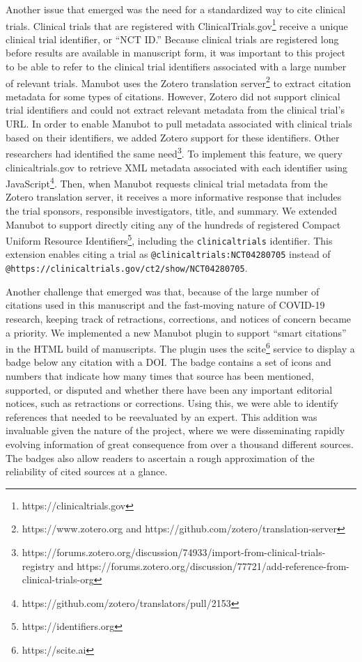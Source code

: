 \documentclass[twocolumn]{ceurart}
\begin{document}
Another issue that emerged was the need for a standardized way to cite clinical trials.
Clinical trials that are registered with ClinicalTrials.gov\footnote{https://clinicaltrials.gov} receive a unique clinical trial identifier, or ``NCT ID.''
Because clinical trials are registered long before results are available in manuscript form, it was important to this project to be able to refer to the clinical trial identifiers associated with a large number of relevant trials.
Manubot uses the Zotero translation server\footnote{https://www.zotero.org and https://github.com/zotero/translation-server} to extract citation metadata for some types of citations.
However, Zotero did not support clinical trial identifiers and could not extract relevant metadata from the clinical trial's URL.
In order to enable Manubot to pull metadata associated with clinical trials based on their identifiers, we added Zotero support for these identifiers.
Other researchers had identified the same need\footnote{https://forums.zotero.org/discussion/74933/import-from-clinical-trials-registry and https://forums.zotero.org/discussion/77721/add-reference-from-clinical-trials-org}.
To implement this feature, we query clinicaltrials.gov to retrieve XML metadata associated with each identifier using JavaScript\footnote{https://github.com/zotero/translators/pull/2153}.
Then, when Manubot requests clinical trial metadata from the Zotero translation server, it receives a more informative response that includes the trial sponsors, responsible investigators, title, and summary.
We extended Manubot to support directly citing any of the hundreds of registered Compact Uniform Resource Identifiers\footnote{https://identifiers.org}, including the \texttt{clinicaltrials} identifier.
This extension enables citing a trial as \texttt{@clinicaltrials:NCT04280705} instead of \texttt{@https://clinicaltrials.gov/ct2/show/NCT04280705}.

Another challenge that emerged was that, because of the large number of citations used in this manuscript and the fast-moving nature of COVID-19 research, keeping track of retractions, corrections, and notices of concern became a priority.
We implemented a new Manubot plugin to support ``smart citations'' in the HTML build of manuscripts.
The plugin uses the scite\footnote{https://scite.ai} \citep{14UJbLWf4} service to display a badge below any citation with a DOI.
The badge contains a set of icons and numbers that indicate how many times that source has been mentioned, supported, or disputed and whether there have been any important editorial notices, such as retractions or corrections.
Using this, we were able to identify references that needed to be reevaluated by an expert.
This addition was invaluable given the nature of the project, where we were disseminating rapidly evolving information of great consequence from over a thousand different sources.
The badges also allow readers to ascertain a rough approximation of the reliability of cited sources at a glance.
\end{document}
